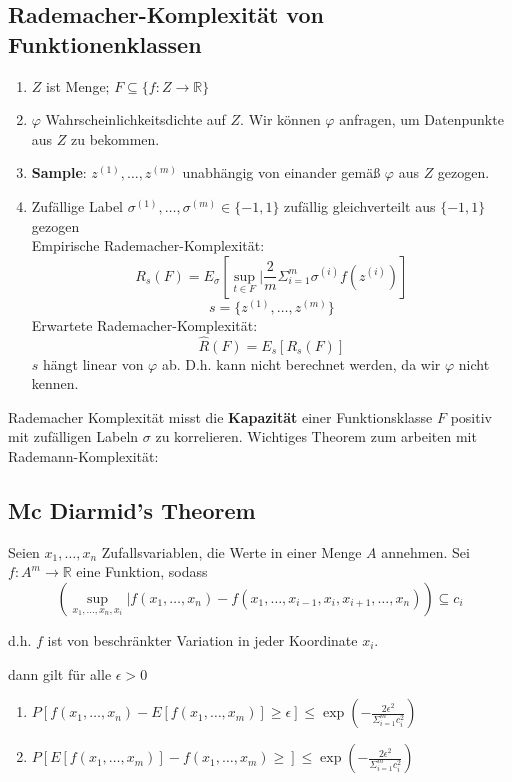 \subsection*{Rademacher-Komplexität von Funktionenklassen}
\begin{enumerate}[1.]
\item $Z$ ist Menge; $F \subseteq \{f: Z \rightarrow \mathbb{R}\}$
\item $\varphi$ Wahrscheinlichkeitsdichte auf $Z$. Wir können $\varphi$ anfragen, um Datenpunkte aus $Z$ zu bekommen.
\item \textbf{Sample}: $z^{(1)}, \dots , z^{(m)}$ unabhängig von einander gemäß $\varphi$ aus $Z$ gezogen.
\item Zufällige Label $\sigma^{(1)}, \dots , \sigma^{(m)} \in \{-1,1\}$ zufällig gleichverteilt aus $\{-1,1\}$ gezogen\\
Empirische Rademacher-Komplexität:
\[R_s(F) = E_\sigma \left[ \underset{t \in F}{\sup}  | \frac{2}{m} \Sigma^m_{i=1} \sigma^{(i)} f(z^{(i)}) \right] \]
\[s= \{z^{(1)}, \dots , z^{(m)}\}\]
Erwartete Rademacher-Komplexität:
\[\hat{R}(F) = E_s [R_s(F)]\]
$s$ hängt linear von $\varphi$ ab. D.h. kann nicht berechnet werden, da wir $\varphi$ nicht kennen.
\end{enumerate}

Rademacher Komplexität misst die \textbf{Kapazität} einer Funktionsklasse $F$ positiv mit zufälligen Labeln $\sigma$ zu korrelieren. Wichtiges Theorem zum arbeiten mit Rademann-Komplexität:

\subsection*{Mc Diarmid's Theorem}
Seien $x_1, \dots , x_n$ Zufallsvariablen, die Werte in einer Menge $A$ annehmen. Sei $f: A^m  \rightarrow \mathbb{R}$ eine Funktion, sodass \[ \left( \underset{x_1, \dots , x_n , x_i}{\sup} | f(x_1, \dots , x_n) - f(x_1, \dots , x_{i-1}, x_i, x_{i+1}, \dots , x_n) \right) \subseteq c_i \]
\begin{addmargin}[2 cm]{0 cm}
d.h. $f$ ist von beschränkter Variation in jeder Koordinate $x_i$.
\end{addmargin}
dann gilt für alle $\epsilon > 0$
\begin{enumerate}[(1)]
\item $P[f(x_1, \dots , x_n) - E[f(x_1, \dots, x_m)] \geq \epsilon] \leq \exp \left( - \frac{2 \epsilon^2}{\Sigma^m_{i=1} c_i^2}\right)$
\item $P[E[f(x_1, \dots, x_m)] -f(x_1, \dots, x_m) \geq ] \leq  \exp \left( - \frac{2 \epsilon^2}{\Sigma^m_{i=1} c_i^2}\right)$
\end{enumerate}

